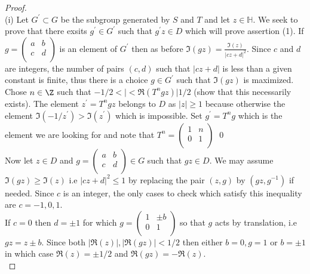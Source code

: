 \documentclass[12pt]{article}
\theoremstyle{definition}
\begin{document}
    \begin{proof}~\\
        (i) Let \(G^{\prime} \subset G  \) be the subgroup generated by \(S\) and \(T\) and let \(z\in \mathbb{H} \). We seek to prove that there exsits \(g^{\prime} \in G^{\prime} \) such that \( g^{\prime} z\in D\) which will prove assertion (1). If \(g = \begin{pmatrix}
            a &  b \\
            c &  d \\
        \end{pmatrix}\) is an element of \(G^{\prime} \) then as before \(\Im(gz)=\frac{\Im(z)}{\vert cz+d \vert^{2} }\). Since \(c\) and \(d\) are integers, the number of pairs \((c,d)\) such that \(\vert cz+d \vert \) is less than a given constant is finite, thus there is a choice \( g\in G^{\prime} \) such that \(\Im(gz)\) is maximized.\\
        Chose \(n\in \Z\) such that \(-1/2 < \vert < \Re (T^{n}gz)  \vert 1/2\) (show that this necessarily exists). The element \(z^{\prime} =T^{n}gz \) belongs to \(D\) as \(\vert z \vert \geq 1\) because otherwise the element \(\Im(-1/z^{\prime} )> \Im(z^{\prime} )\) which is impossible. Set \( g^{\prime} =T^n g\) which is the element we are looking for and note that
        \(T^n = \begin{pmatrix}
            1 &  n \\
            0 &  1 \\
        \end{pmatrix} \)  \qed\\
        Now let \(z\in D\) and \( g = \begin{pmatrix}
            a &  b \\
            c &  d \\
        \end{pmatrix}\in G\) such that \(gz\in D\). We may assume \(\Im(gz)\geq \Im(z)\) i.e \(\vert cz+d \vert^2 \leq 1\) by replacing the pair \((z,g)\) by \((gz,g^{-1} )\) if needed. Since \(c\) is an integer, the only cases to check which satisfy this inequality are \(c=-1,0,1\).\\[12pt]
        If \(c=0\) then \(d=\pm 1\) for which \(g = \begin{pmatrix}
            1 &  \pm b \\
            0 & 1  \\
        \end{pmatrix}\) so that \(g\) acts by translation, i.e \(gz = z \pm b\). Since both \(\vert \Re (z) \vert, \vert \Re (gz) \vert <1/2\) then either \( b=0, g = 1\) or \( b= \pm 1\) in which case  \(\Re (z) = \pm 1/2\) and \(\Re (gz) = -\Re (z)\).\\[6pt]

\end{proof}
\end{document}
